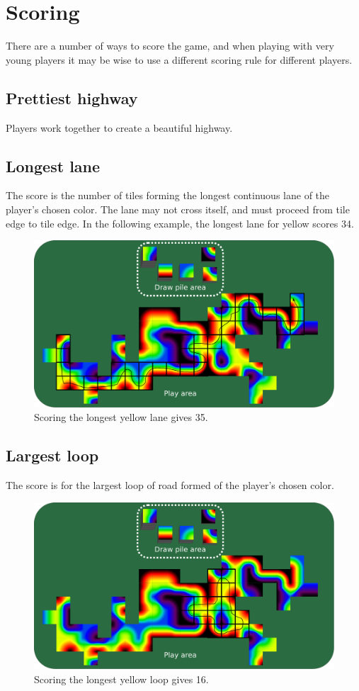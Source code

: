 \documentclass[twocolumn, 12pt]{article}
\begin{document}
\section*{Scoring}
There are a number of ways to score the game, and when playing with
very young players it may be wise to use a different scoring rule for
different players.
\subsection*{Prettiest highway}
Players work together to create a beautiful highway.
\subsection*{Longest lane}
The score is the number of tiles forming the longest continuous lane
of the player’s chosen color. The lane may not cross itself, and must
proceed from tile edge to tile edge.  In the following example, the
longest lane for yellow scores 34.

\begin{figure}[h]
  \includegraphics[width=\columnwidth]{scoring-longest}
  \caption{Scoring the longest yellow lane gives 35.}
\end{figure}

\subsection*{Largest loop}
The score is for the largest loop of road formed of the player’s
chosen color.

\begin{figure}[h]
  \includegraphics[width=\columnwidth]{scoring-loop}
  \caption{Scoring the longest yellow loop gives 16.}
\end{figure}
\end{document}
